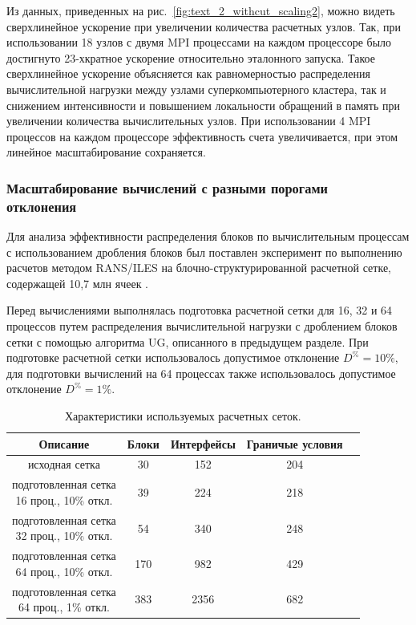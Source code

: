Из данных, приведенных на рис.~\ref{fig:text_2_withcut_scaling2}, можно видеть сверхлинейное ускорение при увеличении количества расчетных узлов.
Так, при использовании 18 узлов с двумя MPI процессами на каждом процессоре было достигнуто 23-хкратное ускорение относительно эталонного запуска.
Такое сверхлинейное ускорение объясняется как равномерностью распределения вычислительной нагрузки между узлами суперкомпьютерного кластера, так и снижением интенсивности и повышением локальности обращений в память при увеличении количества вычислительных узлов.
При использовании 4 MPI процессов на каждом процессоре эффективность счета увеличивается, при этом линейное масштабирование сохраняется.

\subsubsection{Масштабирование вычислений с разными порогами \\ отклонения}

Для анализа эффективности распределения блоков по вычислительным процессам с использованием дробления блоков был поставлен эксперимент по выполнению расчетов методом RANS/ILES на блочно-структурированной расчетной сетке, содержащей 10,7 млн ячеек \cite{Savin2019RANS}.

Перед вычислениями выполнялась подготовка расчетной сетки для 16, 32 и 64 процессов путем распределения вычислительной нагрузки с дроблением блоков сетки с помощью алгоритма UG, описанного в предыдущем разделе.
При подготовке расчетной сетки использовалось допустимое отклонение $D^{\%} = 10\%$, для подготовки вычислений на 64 процессах также использовалось допустимое отклонение $D^{\%} = 1\%$.

\begin{table}[!ht]
\centering
\singlespacing
{}\caption{Характеристики используемых расчетных сеток.}
\bigskip
\label{tbl:text_2_withcut}
\begin{tabular}{ | c | c | c | c | c | }
  \hline
  Описание & Блоки & Интерфейсы & Граничые условия \\ \hline\hline
  исходная сетка & 30 & 152 & 204 \\ \hline\hline
  \makecell{подготовленная сетка \\ 16 проц., 10\% откл.} & 39 & 224 & 218 \\ \hline
  \makecell{подготовленная сетка \\ 32 проц., 10\% откл.} & 54 & 340 & 248 \\ \hline
  \makecell{подготовленная сетка \\ 64 проц., 10\% откл.} & 170 & 982 & 429 \\ \hline\hline
  \makecell{подготовленная сетка \\ 64 проц., 1\% откл.} & 383 & 2356 & 682 \\ \hline
\end{tabular}
\end{table}


